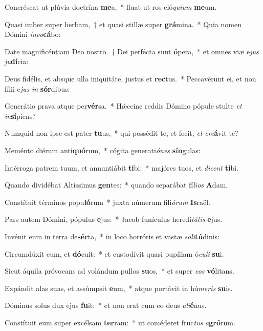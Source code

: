 \item Concréscat ut plúvia doctrína \textbf{me}a,~* fluat ut ros eló\textit{qui}\textit{um} \textbf{me}um.
\item Quasi imber super herbam,~† et quasi stillæ super \textbf{grá}mina.~* Quia nomen Dómini \textit{in}\textit{vo}\textbf{cá}bo:
\item Date magnificéntiam Deo nostro.~† Dei perfécta sunt \textbf{ó}pera,~* et omnes viæ e\textit{jus} \textit{ju}\textbf{dí}cia:
\item Deus fidélis, et absque ulla iniquitáte, justus et \textbf{rec}tus.~* Peccavérunt ei, et non fílii e\textit{jus} \textit{in} \textbf{sór}dibus:
\item Generátio prava atque per\textbf{vér}sa.~* Hǽccine reddis Dómino pópule stulte \textit{et} \textit{in}\textbf{sí}piens?
\item Numquid non ipse est pater \textbf{tu}us,~* qui possédit te, et fecit, \textit{et} \textit{cre}\textbf{á}vit te?
\item Meménto diérum anti\textbf{quó}rum,~* cógita generati\textit{ó}\textit{nes} \textbf{sín}gulas:
\item Intérroga patrem tuum, et annuntiábit \textbf{ti}bi:~* majóres tuos, et \textit{di}\textit{cent} \textbf{ti}bi.
\item Quando dividébat Altíssimus \textbf{gen}tes:~* quando separábat fí\textit{li}\textit{os} \textbf{A}dam,
\item Constítuit términos popu\textbf{ló}rum~* juxta númerum fili\textit{ó}\textit{rum} \textbf{Is}raël.
\item Pars autem Dómini, pópulus \textbf{e}jus:~* Jacob funículus heredi\textit{tá}\textit{tis} \textbf{e}jus.
\item Invénit eum in terra de\textbf{sér}ta,~* in loco horróris et vastæ \textit{so}\textit{li}\textbf{tú}dinis:
\item Circumdúxit eum, et \textbf{dó}cuit:~* et custodívit quasi pupíllam ó\textit{cu}\textit{li} \textbf{su}i.
\item Sicut áquila próvocans ad volándum pullos \textbf{su}os,~* et super \textit{e}\textit{os} \textbf{vó}litans.
\item Expándit alas suas, et assúmpsit \textbf{e}um,~* atque portávit in hú\textit{me}\textit{ris} \textbf{su}is.
\item Dóminus solus dux ejus \textbf{fu}it:~* et non erat cum eo deus \textit{a}\textit{li}\textbf{é}nus.
\item Constítuit eum super excélsam \textbf{ter}ram:~* ut coméderet fruc\textit{tus} \textit{a}\textbf{gró}rum.

